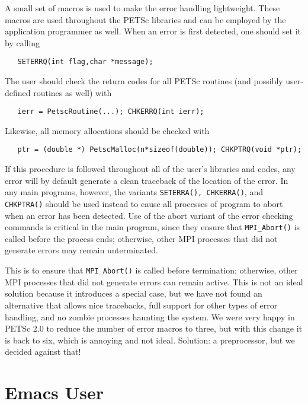 A small set of macros is used to make the error handling lightweight.
These macros are used throughout the PETSc libraries and can be employed
by the application programmer as well.  When an error is first detected, 
one should set it by calling
\begin{verbatim}
   SETERRQ(int flag,char *message);
\end{verbatim}
The user should check the return codes for all PETSc routines (and
possibly user-defined routines as well) with 
\begin{verbatim}
   ierr = PetscRoutine(...); CHKERRQ(int ierr);
\end{verbatim}
Likewise, all memory allocations should be checked with 
\begin{verbatim}
   ptr = (double *) PetscMalloc(n*sizeof(double)); CHKPTRQ(void *ptr);
\end{verbatim}
If this procedure is followed throughout all of the user's libraries 
and codes, any error will by default generate a clean traceback of 
the location of the error.  In any main programs, however, the variants
{\tt SETERRA(), CHKERRA()}, and {\tt CHKPTRA()} should be used instead 
to cause all processes of program to abort when an error has been detected. 
Use of the abort variant of the error checking commands is critical
in the main program, since they ensure that {\tt MPI\_Abort()} is called 
before the process ends; otherwise, other MPI processes that 
did not generate errors may remain unterminated.

\begin{design}
This is to ensure that {\tt MPI\_Abort()} is called before termination;
otherwise, other MPI processes that did not generate errors can remain active.
This is not an ideal solution because it introduces a special case,
but we have not found an alternative that allows nice tracebacks, full 
support for other types of error handling, and no zombie processes
haunting the system.  We were very happy in PETSc 2.0 to reduce the 
number of error macros to three, but with this 
change it is back to six, which is annoying and not ideal.
Solution: a preprocessor, but we decided against that!
\end{design}

\section{Emacs User}  \label{sec:emacs}

